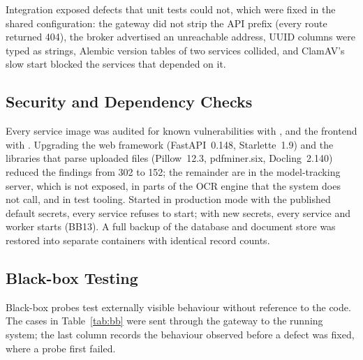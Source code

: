 Integration exposed defects that unit tests could not, which were fixed in the shared configuration: the gateway did not strip the API prefix (every route returned 404), the broker advertised an unreachable address, UUID columns were typed as strings, Alembic version tables of two services collided, and ClamAV's slow start blocked the services that depended on it.

\subsection{Security and Dependency Checks}\label{sec:deps}
Every service image was audited for known vulnerabilities with , and the frontend with . Upgrading the web framework (FastAPI~0.148, Starlette~1.9) and the libraries that parse uploaded files (Pillow~12.3, pdfminer.six, Docling~2.140) reduced the findings from 302 to 152; the remainder are in the model-tracking server, which is not exposed, in parts of the OCR engine that the system does not call, and in test tooling. Started in production mode with the published default secrets, every service refuses to start; with new secrets, every service and worker starts (BB13). A full backup of the database and document store was restored into separate containers with identical record counts.

\subsection{Black-box Testing}
Black-box probes test externally visible behaviour without reference to the code. The cases in Table~\ref{tab:bb} were sent through the gateway to the running system; the last column records the behaviour observed before a defect was fixed, where a probe first failed.

